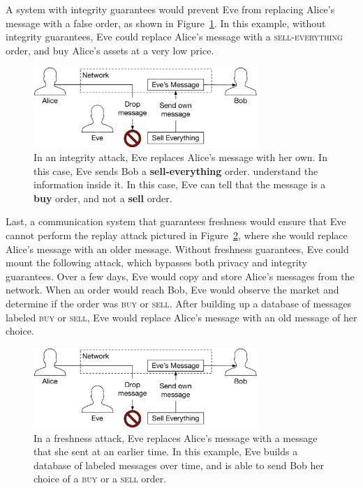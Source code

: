 A system with integrity guarantees would prevent Eve from replacing Alice's
message with a false order, as shown in Figure~\ref{fig:integrity_attack}. In
this example, without integrity guarantees, Eve could replace Alice's message
with a \textsc{sell-everything} order, and buy Alice's assets at a very low
price.

\begin{figure}[hbt]
  \centering
  \includegraphics[width=85mm]{figures/integrity_attack.pdf}
  \caption{
    In an integrity attack, Eve replaces Alice's message with her own. In this
    case, Eve sends Bob a \textbf{sell-everything} order.
    understand the information inside it. In this case, Eve can tell that the
    message is a \textbf{buy} order, and not a \textbf{sell} order.
  }
  \label{fig:integrity_attack}
\end{figure}

Last, a communication system that guarantees freshness would ensure that Eve
cannot perform the replay attack pictured in Figure~\ref{fig:freshness_attack},
where she would replace Alice's message with an older message. Without
freshness guarantees, Eve could mount the following attack, which bypasses
both privacy and integrity guarantees. Over a few days, Eve would copy and
store Alice's messages from the network. When an order would reach Bob, Eve
would observe the market and determine if the order was \textsc{buy} or
\textsc{sell}. After building up a database of messages labeled \textsc{buy} or
\textsc{sell}, Eve would replace Alice's message with an old message of her
choice.

\begin{figure}[hbt]
  \centering
  \includegraphics[width=85mm]{figures/integrity_attack.pdf}
  \caption{
    In a freshness attack, Eve replaces Alice's message with a message that she
    sent at an earlier time. In this example, Eve builds a database of labeled
    messages over time, and is able to send Bob her choice of a \textsc{buy} or
    a \textsc{sell} order.
  }
  \label{fig:freshness_attack}
\end{figure}



